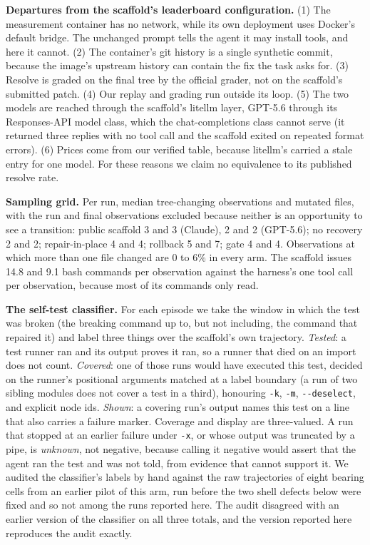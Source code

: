 \documentclass{article}
\begin{document}
\textbf{Departures from the scaffold's leaderboard configuration.} (1) The measurement container has no network, while its own deployment uses Docker's default bridge. The unchanged prompt tells the agent it may install tools, and here it cannot. (2) The container's git history is a single synthetic commit, because the image's upstream history can contain the fix the task asks for. (3) Resolve is graded on the final tree by the official grader, not on the scaffold's submitted patch. (4) Our replay and grading run outside its loop. (5) The two models are reached through the scaffold's litellm layer, GPT-5.6 through its Responses-API model class, which the chat-completions class cannot serve (it returned three replies with no tool call and the scaffold exited on repeated format errors). (6) Prices come from our verified table, because litellm's carried a stale entry for one model. For these reasons we claim no equivalence to its published resolve rate.

\textbf{Sampling grid.} Per run, median tree-changing observations and mutated files, with the run and final observations excluded because neither is an opportunity to see a transition: public scaffold 3 and 3 (Claude), 2 and 2 (GPT-5.6); no recovery 2 and 2; repair-in-place 4 and 4; rollback 5 and 7; gate 4 and 4. Observations at which more than one file changed are 0 to 6\% in every arm. The scaffold issues 14.8 and 9.1 bash commands per observation against the harness's one tool call per observation, because most of its commands only read.

\textbf{The self-test classifier.} For each episode we take the window in which the test was broken (the breaking command up to, but not including, the command that repaired it) and label three things over the scaffold's own trajectory. \emph{Tested}: a test runner ran and its output proves it ran, so a runner that died on an import does not count. \emph{Covered}: one of those runs would have executed this test, decided on the runner's positional arguments matched at a label boundary (a run of two sibling modules does not cover a test in a third), honouring \texttt{-k}, \texttt{-m}, \texttt{-{}-deselect}, and explicit node ids. \emph{Shown}: a covering run's output names this test on a line that also carries a failure marker. Coverage and display are three-valued. A run that stopped at an earlier failure under \texttt{-x}, or whose output was truncated by a pipe, is \emph{unknown}, not negative, because calling it negative would assert that the agent ran the test and was not told, from evidence that cannot support it. We audited the classifier's labels by hand against the raw trajectories of eight bearing cells from an earlier pilot of this arm, run before the two shell defects below were fixed and so not among the runs reported here. The audit disagreed with an earlier version of the classifier on all three totals, and the version reported here reproduces the audit exactly.
\end{document}
